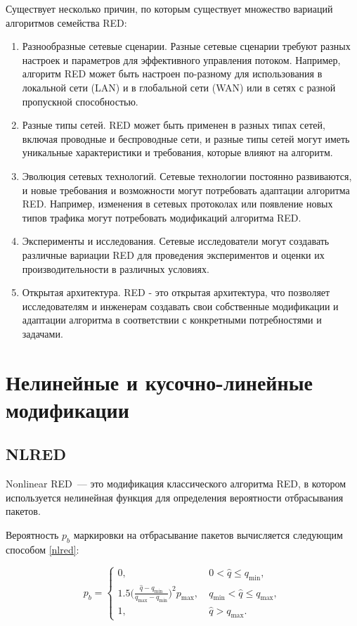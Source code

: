 Существует несколько причин, по которым существует множество вариаций алгоритмов семейства RED:

\begin{enumerate}
\item Разнообразные сетевые сценарии. Разные сетевые сценарии требуют разных настроек и параметров для эффективного управления потоком. Например, алгоритм RED может быть настроен по-разному для использования в локальной сети (LAN) и в глобальной сети (WAN) или в сетях с разной пропускной способностью.
\item Разные типы сетей. RED может быть применен в разных типах сетей, включая проводные и беспроводные сети, и разные типы сетей могут иметь уникальные характеристики и требования, которые влияют на алгоритм.
\item Эволюция сетевых технологий. Сетевые технологии постоянно развиваются, и новые требования и возможности могут потребовать адаптации алгоритма RED. Например, изменения в сетевых протоколах или появление новых типов трафика могут потребовать модификаций алгоритма RED.
\item Эксперименты и исследования. Сетевые исследователи могут создавать различные вариации RED для проведения экспериментов и оценки их производительности в различных условиях.
\item Открытая архитектура. RED - это открытая архитектура, что позволяет исследователям и инженерам создавать свои собственные модификации и адаптации алгоритма в соответствии с конкретными потребностями и задачами.
\end{enumerate}


\section{Нелинейные и кусочно-линейные модификации}
\label{chap2:sec2}

\subsection{NLRED}

Nonlinear RED~--- это модификация классического алгоритма RED, в
котором используется нелинейная функция для определения
вероятности отбрасывания пакетов. 
 
Вероятность $p_{b}$ маркировки на
отбрасывание пакетов вычисляется следующим способом \eqref{nlred}:

\begin{equation}
\label{nlred}
p_{b} = \begin{cases}
        0, &  \ 0 < \hat{q} \leqslant q_{\min},
        \\
        1.5({\frac{\hat{q} - q_{\min}}{q_{\max} - q_{\min}})^2} {p_{\max}}, & \ q_{\min} < \hat{q} \leqslant q_{\max},
        \\
        1, &  \ \hat{q} > q_{\max}.
\end{cases}
\end{equation}

